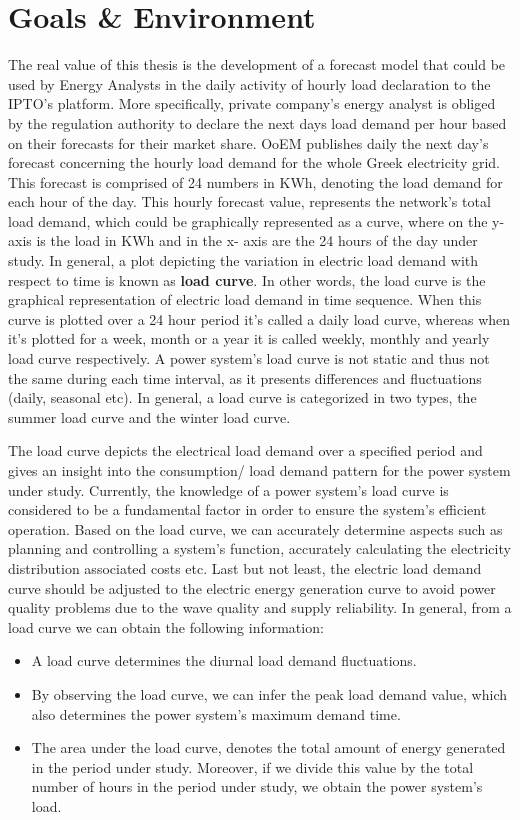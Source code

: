 \section{Goals \& Environment}
The real value of this thesis is the development of a forecast model that could be used by Energy Analysts in the daily activity of hourly load declaration to the IPTO's platform. More specifically,  private company's energy analyst is obliged by the regulation authority to declare the next days load demand per hour based on their forecasts for their market share. OoEM publishes daily the next day's forecast concerning the hourly load demand for the whole Greek electricity grid. This forecast is comprised of 24 numbers in KWh, denoting the load demand for each hour of the day. This hourly forecast value, represents the network's total load demand, which could be graphically represented as a curve, where on the y-axis is the load in KWh and in the x- axis are the 24 hours of the day under study.
In general, a plot depicting the variation in electric load demand with respect to time is known as \textbf{load curve}. In other words, the load curve is the graphical representation of electric load demand in time sequence. When this curve is plotted over a 24 hour period it's called a daily load curve, whereas when it's plotted for a week, month or a year it is called  weekly, monthly and yearly load curve respectively. A power system's load curve is not static and thus not the same during each time interval, as it presents differences and fluctuations (daily, seasonal etc). In general, a load curve is categorized in two types, the summer load curve and the winter load curve.
\par The load curve depicts the electrical load demand over a specified period and gives an insight into the consumption/ load demand pattern for the power system under study. Currently, the knowledge of a power system's load curve is considered to be a fundamental factor in order to ensure the system's efficient operation. Based on the load curve, we can accurately determine aspects such as planning and controlling a system's function, accurately calculating the electricity distribution associated costs etc.
Last but not least, the electric load demand curve should be adjusted to the electric energy generation curve to avoid power quality problems due to the wave quality and supply reliability. In general, from a load curve we can obtain the following information:
\begin{itemize}
    \item A load curve determines the diurnal load demand fluctuations.
    \item By observing the load curve, we can infer the peak load demand value, which also determines the power system's maximum demand time.
    \item The area under the load curve, denotes the total amount of energy generated in the period under study. Moreover, if we divide this value by the total number of hours in the period under study, we obtain the power system's load.
\end{itemize}
